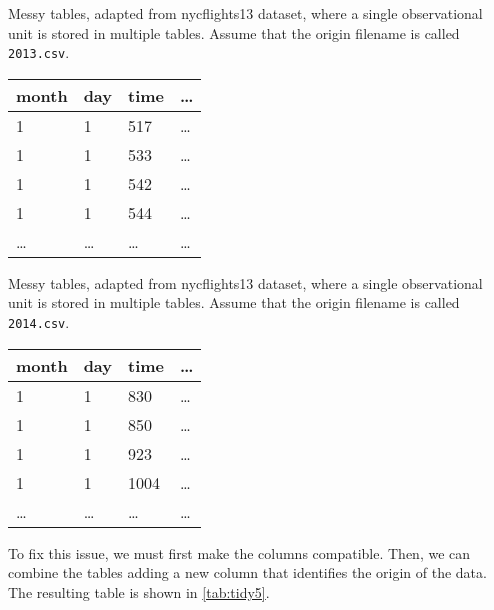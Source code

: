 \begin{tablebox}[label=tab:messy5a]{Messy tables, adapted from nycflights13 dataset, where
  a single observational unit is stored in multiple tables.  Assume that the origin
  filename is called \texttt{2013.csv}.}
  \centering
  \begin{tabular}{llll}
    \toprule
    month & day & time & \dots \\
    \midrule
    1 & 1 & 517 & \dots \\
    1 & 1 & 533 & \dots \\
    1 & 1 & 542 & \dots \\
    1 & 1 & 544 & \dots \\
    \dots & \dots & \dots & \dots \\
    \bottomrule
  \end{tabular}
\end{tablebox}

\begin{tablebox}[label=tab:messy5b]{Messy tables, adapted from nycflights13 dataset, where
  a single observational unit is stored in multiple tables.  Assume that the origin
  filename is called \texttt{2014.csv}.}
  \centering
  \begin{tabular}{llll}
    \toprule
    month & day & time & \dots \\
    \midrule
    1 & 1 & 830 & \dots \\
    1 & 1 & 850 & \dots \\
    1 & 1 & 923 & \dots \\
    1 & 1 & 1004 & \dots \\
    \dots & \dots & \dots & \dots \\
    \bottomrule
  \end{tabular}
\end{tablebox}

To fix this issue, we must first make the columns compatible.  Then, we can combine the
tables adding a new column that identifies the origin of the data.  The resulting table is
shown in \cref{tab:tidy5}.

